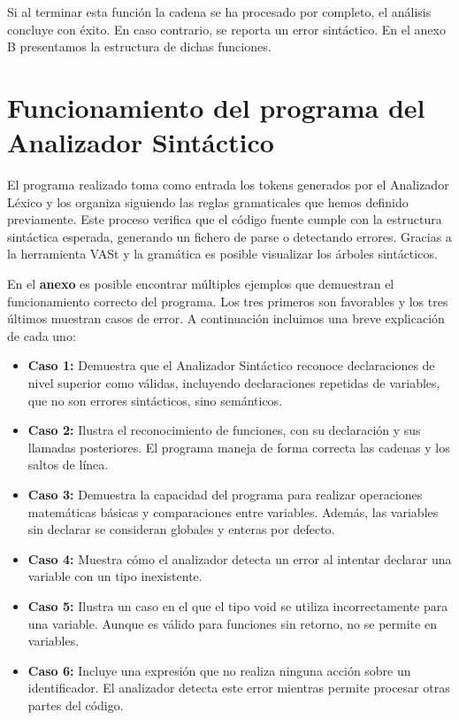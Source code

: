 \documentclass{article}
\begin{document}
Si al terminar esta función la cadena se ha procesado por completo, el análisis concluye con éxito. En caso contrario, se reporta un error sintáctico. En el anexo B presentamos la estructura de dichas funciones.

\section{Funcionamiento del programa del Analizador Sintáctico}
El programa realizado toma como entrada los tokens generados por el Analizador Léxico y los organiza siguiendo las reglas gramaticales que hemos definido previamente. Este proceso verifica que el código fuente cumple con la estructura sintáctica esperada, generando un fichero de parse o detectando errores. Gracias a la herramienta VASt y la gramática es posible visualizar los árboles sintácticos.

En el \textbf{anexo} es posible encontrar múltiples ejemplos que demuestran el funcionamiento correcto del programa. Los tres primeros son favorables y los tres últimos muestran casos de error. A continuación incluimos una breve explicación de cada uno:

\begin{itemize}
    \item \textbf{Caso 1:} Demuestra que el Analizador Sintáctico reconoce declaraciones de nivel superior como válidas, incluyendo declaraciones repetidas de variables, que no son errores sintácticos, sino semánticos.

    \item \textbf{Caso 2:} Ilustra el reconocimiento de funciones, con su declaración y sus llamadas posteriores. El programa maneja de forma correcta las cadenas y los saltos de línea.
    
    \item \textbf{Caso 3:} Demuestra la capacidad del programa para realizar operaciones matemáticas básicas y comparaciones entre variables. Además, las variables sin declarar se consideran globales y enteras por defecto.
    
    \item \textbf{Caso 4:} Muestra cómo el analizador detecta un error al intentar declarar una variable con un tipo inexistente.
    
    \item \textbf{Caso 5:} Ilustra un caso en el que el tipo void se utiliza incorrectamente para una variable. Aunque es válido para funciones sin retorno, no se permite en variables.
    
    \item \textbf{Caso 6:} Incluye una expresión que no realiza ninguna acción sobre un identificador. El analizador detecta este error mientras permite procesar otras partes del código.
\end{itemize}
\end{document}
